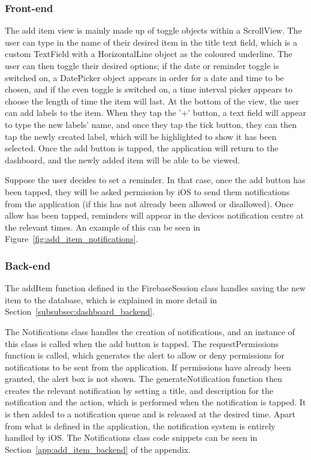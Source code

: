         \subsubsection{Front-end}
        The add item view is mainly made up of toggle objects within a ScrollView.  The user can type in the name of their desired item in the title text field, which is a custom TextField with a HorizontalLine object as the coloured underline.  The user can then toggle their desired options; if the date or reminder toggle is switched on, a DatePicker object appears in order for a date and time to be chosen, and if the even toggle is switched on, a time interval picker appears to choose the length of time the item will last.  At the bottom of the view, the user can add labels to the item.  When they tap the '+' button, a text field will appear to type the new labels' name, and once they tap the tick button, they can then tap the newly created label, which will be highlighted to show it has been selected.  Once the add button is tapped, the application will return to the dashboard, and the newly added item will be able to be viewed.
        
        Suppose the user decides to set a reminder. In that case, once the add button has been tapped, they will be asked permission by iOS to send them notifications from the application (if this has not already been allowed or disallowed).  Once allow has been tapped, reminders will appear in the devices notification centre at the relevant times.  An example of this can be seen in Figure~\ref{fig:add_item_notifications}.
        
        
        
        \subsubsection{Back-end}
        The addItem function defined in the FirebaseSession class handles saving the new item to the database, which is explained in more detail in Section~\ref{subsubsec:dashboard_backend}.
        
        The Notifications class handles the creation of notifications, and an instance of this class is called when the add button is tapped.  The requestPermissions function is called, which generates the alert to allow or deny permissions for notifications to be sent from the application.  If permissions have already been granted, the alert box is not shown.  The generateNotification function then creates the relevant notification by setting a title, and description for the notification and the action, which is performed when the notification is tapped.  It is then added to a notification queue and is released at the desired time.  Apart from what is defined in the application, the notification system is entirely handled by iOS.  The Notifications class code snippets can be seen in Section~\ref{app:add_item_backend} of the appendix.
        
